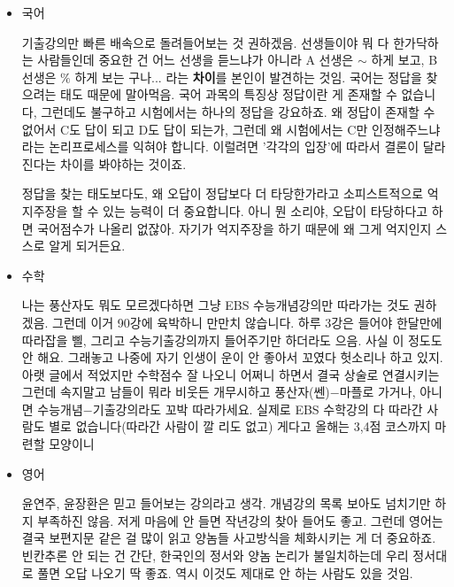 \begin{itemize}
    

    \item 국어
    \vspace{5mm}

    기출강의만 빠른 배속으로 돌려들어보는 것 권하겠음.
    선생들이야 뭐 다 한가닥하는 사람들인데 중요한 건 어느 선생을 듣느냐가 아니라
    A 선생은 $\sim$ 하게 보고, B 선생은 $\%$ 하게 보는 구나... 라는 \textbf{차이}를 본인이 발견하는 것임.
    국어는 정답을 찾으려는 태도 때문에 말아먹음.
    국어 과목의 특징상 정답이란 게 존재할 수 없습니다, 그런데도 불구하고 시험에서는 하나의 정답을 강요하죠.
    왜 정답이 존재할 수 없어서 C도 답이 되고 D도 답이 되는가, 그런데 왜 시험에서는 C만 인정해주느냐
    라는 논리프로세스를 익혀야 합니다. 이럴려면 '각각의 입장'에 따라서 결론이 달라진다는 차이를 봐야하는 것이죠.
    \vspace{5mm}

    정답을 찾는 태도보다도, 왜 오답이 정답보다 더 타당한가라고 소피스트적으로 억지주장을 할 수 있는 능력이 더 중요합니다.
    아니 뭔 소리야, 오답이 타당하다고 하면 국어점수가 나올리 없잖아.
    자기가 억지주장을 하기 때문에 왜 그게 억지인지 스스로 알게 되거든요.
    \vspace{5mm}

    \item 수학
    \vspace{5mm}

    나는 풍산자도 뭐도 모르겠다하면 그냥 EBS 수능개념강의만 따라가는 것도 권하겠음.
    그런데 이거 90강에 육박하니 만만치 않습니다. 하루 3강은 들어야 한달만에 따라잡을 삘,
    그리고 수능기출강의까지 들어주기만 하더라도 으음.
    사실 이 정도도 안 해요. 그래놓고 나중에 자기 인생이 운이 안 좋아서 꼬였다 헛소리나 하고 있지.
    아랫 글에서 적었지만 수학점수 잘 나오니 어쩌니 하면서 결국 상술로 연결시키는 그런데 속지말고
    남들이 뭐라 비웃든 개무시하고 풍산자(쎈)$-$마플로 가거나, 아니면 수능개념$-$기출강의라도 꼬박 따라가세요.
    실제로 EBS 수학강의 다 따라간 사람도 별로 없습니다(따라간 사람이 깔 리도 없고)
    게다고 올해는 3,4점 코스까지 마련할 모양이니
    \vspace{5mm}

    \item 영어
    \vspace{5mm}

    윤연주, 윤장환은 믿고 들어보는 강의라고 생각.
    개념강의 목록 보아도 넘치기만 하지 부족하진 않음. 저게 마음에 안 들면 작년강의 찾아 들어도 좋고.
    그런데 영어는 결국 보편지문 같은 걸 많이 읽고 양놈들 사고방식을 체화시키는 게 더 중요하죠.
    빈칸추론 안 되는 건 간단, 한국인의 정서와 양놈 논리가 불일치하는데 우리 정서대로 풀면 오답 나오기 딱 좋죠.
    역시 이것도 제대로 안 하는 사람도 있을 것임.
    \vspace{5mm}


\end{itemize}
